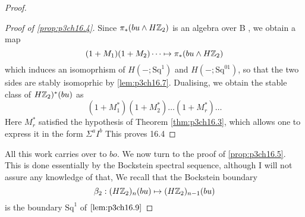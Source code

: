 \documentclass[../main]{subfiles}
\begin{document}
\begin{proof}
\begin{proof}[Proof of \ref{prop:p3ch16.4}]
   Since $\pi_{\ast}(bu \wedge H\mathbb{Z}_2)$ is an algebra over B , we obtain a map \begin{equation*}
       (1+M_{1})(1+M_{2})\dots \mapsto \pi_{\ast}(bu \wedge H\mathbb{Z}_2)
   \end{equation*}
   which induces an isomoprhism of $H(-;\mathrm{Sq}^{1})$ and $H(-;\mathrm{Sq}^{01})$, so that the two sides are stably isomoprhic by \ref{lem:p3ch16.7}. Dualising, we obtain the stable class of $H\mathbb{Z}_2)^{\ast}(bu)$ as \begin{equation*}
        (1+M_{1}^{\ast})(1+M_{2}^{\ast})\dots(1+M_{r}^{\ast})\dots
   \end{equation*}
   Here $M_{r}^{\ast}$ satisfied the hypothesis of Theorem \ref{thm:p3ch16.3}, which allows one to express it in the form  $\Sigma^{a}I^{b}$ This proves 16.4 
   \end{proof}
    All this work carries over to $bo$.
    We now turn to the proof of \ref{prop:p3ch16.5}. This is done essentially by the
Bockstein spectral sequence, although I will not assure any knowledge of
that, We recall that the Bockstein boundary \begin{equation*}
    \beta_{2}:(H\mathbb{Z}_2)_{n}(bu) \mapsto (H\mathbb{Z}_2)_{n-1}(bu) 
\end{equation*}
    is the boundary $\mathrm{Sq}^{1}$ of $\ref{lem:p3ch16.9}$ 
\end{proof}
\end{document}
